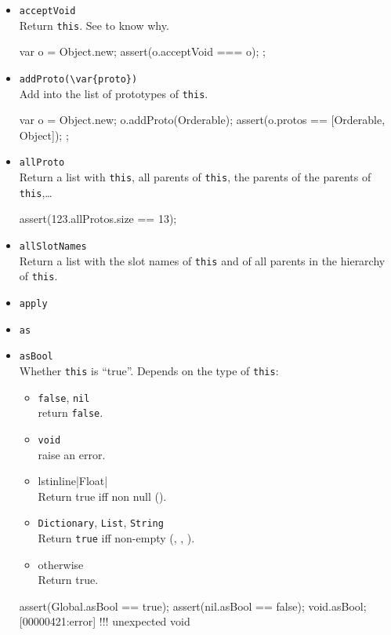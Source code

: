 \begin{itemize}
\item \lstinline|acceptVoid|\\
  Return \lstinline|this|.  See  to know why.
\begin{urbiscript}[firstnumber=last]
{
  var o = Object.new;
  assert(o.acceptVoid === o);
};
\end{urbiscript}


\item \lstinline|addProto(\var{proto})|\\
  Add  into the list of prototypes of \lstinline|this|.
\begin{urbiscript}[firstnumber=last]
{
  var o = Object.new;
  o.addProto(Orderable);
  assert(o.protos == [Orderable, Object]);
};
\end{urbiscript}

\item \lstinline|allProto|\\
  Return a list with \lstinline|this|, all parents of
  \lstinline|this|, the parents of the parents of
  \lstinline|this|,\ldots
\begin{urbiscript}[firstnumber=last]
assert(123.allProtos.size == 13);
\end{urbiscript}

\item \lstinline|allSlotNames|\\
  Return a list with the slot names of \lstinline|this| and of all
  parents in the hierarchy of \lstinline|this|.

\item \lstinline|apply|\\

\item \lstinline|as|\\

\item \lstinline|asBool|\\
  Whether \lstinline|this| is ``true''.  Depends on the type of
  \lstinline|this|:
  \begin{itemize}
  \item \lstinline|false|, \lstinline|nil|\\
    return \lstinline|false|.
  \item  \lstinline|void|\\
    raise an error.
  \item lstinline|Float|\\
    Return true iff non null ().
  \item \lstinline|Dictionary|, \lstinline|List|,  \lstinline|String|\\
    Return \lstinline|true| iff non-empty (,
    , ).
  \item otherwise\\
    Return true.
  \end{itemize}
\begin{urbiscript}[firstnumber=last]
assert(Global.asBool == true);
assert(nil.asBool ==    false);
void.asBool;
[00000421:error] !!! unexpected void
\end{urbiscript}


\end{itemize}

